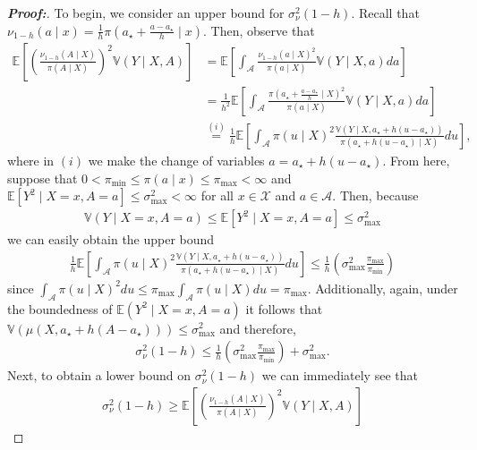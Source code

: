 \documentclass[11pt,twoside]{article}
\theoremstyle{definition}
\theoremstyle{remark}
\begin{document}
\begin{proof}[\textbf{Proof:}]
To begin, we consider an upper bound for $\sigma^2_\nu(1-h)$. Recall that $\nu_{1-h}(a \! \mid \! x) = \frac{1}{h} \pi\left(a_\star + \frac{a - a_\star}{h} \mid x \right)$. Then, observe that
\begin{align*}
    \mathbb{E}\left[\left(\frac{\nu_{1-h}(A \! \mid \! X)}{\pi(A \! \mid \! X)}\right)^2 \mathbb{V}(Y \mid X, A)  \right] &= \mathbb{E}\left[\int_\mathcal{A} \frac{\nu_{1-h}(a \! \mid \! X)^2}{\pi(a \! \mid \! X)} \mathbb{V}(Y \mid X, a) da \right] \\
    &= \frac{1}{h^2} \mathbb{E}\left[\int_\mathcal{A} \frac{\pi(a_\star + \frac{a - a_\star}{h} \! \mid \! X)^2}{\pi(a \! \mid \! X)} \mathbb{V}(Y \mid X, a) da \right] \\
    &\overset{(i)}{=} \frac{1}{h} \mathbb{E}\left[\int_\mathcal{A}\pi(u \! \mid \! X)^2 \frac{\mathbb{V}(Y \mid X, a_\star + h(u - a_\star))}{\pi(a_\star + h(u - a_\star) \! \mid \! X)}  du \right], 
\end{align*}
where in $(i)$ we make the change of variables $a = a_\star + h(u - a_\star)$. From here, suppose that $0 < \pi_{\min} \leq \pi(a \! \mid \! x) \leq \pi_{\max} < \infty$ and $\mathbb{E}[Y^2 \mid X = x, A = a] \leq \sigma^2_{\max} < \infty$ for all $x \in \mathcal{X}$ and $a \in \mathcal{A}$. Then, because
\begin{align*}
    \mathbb{V}(Y \mid X = x, A = a) \leq \mathbb{E}[Y^2 \mid X = x, A = a] \leq \sigma^2_{\max}
\end{align*}
we can easily obtain the upper bound
\begin{align*}
    \frac{1}{h} \mathbb{E}\left[\int_\mathcal{A}\pi(u \! \mid \! X)^2 \frac{\mathbb{V}(Y \mid X, a_\star + h(u - a_\star))}{\pi(a_\star + h(u - a_\star) \! \mid \! X)}  du \right] \leq \frac{1}{h}\left(\sigma^2_{\max} \frac{\pi_{\max}}{\pi_{\min}} \right)
\end{align*}
since $\int_\mathcal{A}\pi(u \! \mid \! X)^2 du \leq \pi_{\max} \int_\mathcal{A}\pi(u \! \mid \! X)du = \pi_{\max}$. Additionally, again, under the boundedness of $\mathbb{E}(Y^2 \mid X = x, A = a)$ it follows that $\mathbb{V}(\mu(X, a_\star + h(A - a_\star))) \leq \sigma^2_{\max}$ and therefore,
\begin{align*}
    \sigma^2_\nu(1-h) \leq \frac{1}{h}\left(\sigma^2_{\max} \frac{\pi_{\max}}{\pi_{\min}} \right) + \sigma^2_{\max}.
\end{align*}
Next, to obtain a lower bound on $\sigma^2_\nu(1-h)$ we can immediately see that
\begin{align*}
    \sigma^2_\nu(1-h) \geq \mathbb{E}\left[\left(\frac{\nu_{1-h}(A \! \mid \! X)}{\pi(A \! \mid \! X)}\right)^2 \mathbb{V}(Y \mid X, A)  \right]

\end{align*}
\end{proof}
\end{document}
